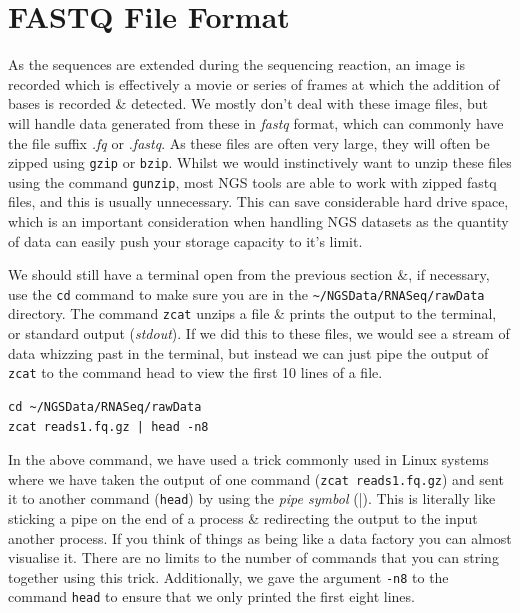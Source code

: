 \section{FASTQ File Format}
\begin{note}
As the sequences are extended during the sequencing reaction, an image is recorded which is effectively a movie or series of frames at which the addition of bases is recorded \& detected.
We mostly don't deal with these image files, but will handle data generated from these in \textit{fastq} format, which can commonly have the file suffix \textit{.fq} or \textit{.fastq}.
As these files are often very large, they will often be zipped using \texttt{gzip} or \texttt{bzip}.
Whilst we would instinctively want to unzip these files using the command \texttt{gunzip}, most NGS tools are able to work with zipped fastq files, and this is usually unnecessary.
This can save considerable hard drive space, which is an important consideration when handling NGS datasets as the quantity of data can easily push your storage capacity to it's limit. \\
\end{note}

\begin{steps}
We should still have a terminal open from the previous section \&, if necessary, use the \texttt{cd} command to make sure you are in the \texttt{\~{}/NGSData/RNASeq/rawData} directory.
The command \texttt{zcat} unzips a file \& prints the output to the terminal, or standard output (\textit{stdout}).
If we did this to these files, we would see a stream of data whizzing past in the terminal, but instead we can just pipe the output of \texttt{zcat} to the command head to view the first 10 lines of a file. \\
\begin{lstlisting}
cd ~/NGSData/RNASeq/rawData
zcat reads1.fq.gz | head -n8
\end{lstlisting}
\end{steps}

\begin{information}
In the above command, we have used a trick commonly used in Linux systems where we have taken the output of one command (\texttt{zcat reads1.fq.gz}) and sent it to another command (\texttt{head}) by using the \textit{pipe symbol} (|).
This is literally like sticking a pipe on the end of a process \& redirecting the output to the input another process.
If you think of things as being like a data factory you can almost visualise it.
There are no limits to the number of commands that you can string together using this trick. 
Additionally, we gave the argument \texttt{-n8} to the command \texttt{head} to ensure that we only printed the first eight lines.\\
\end{information}

